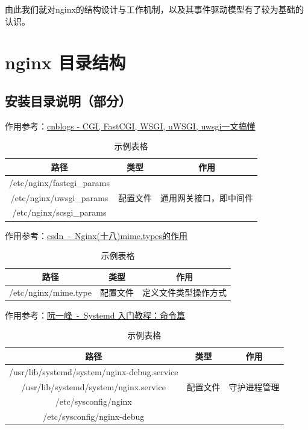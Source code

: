 \documentclass[12pt, a4paper]{article} %
\renewcommand{\tablename}{表} %
\begin{document}
\begin{CJK*}{UTF8}{gbsn}
由此我们就对nginx的结构设计与工作机制，以及其事件驱动模型有了较为基础的认识。


\clearpage
\section{nginx 目录结构}
\subsection{安装目录说明（部分）}

作用参考：\href{https://www.cnblogs.com/kai-/p/12810051.html}{cnblogs - CGI, FastCGI, WSGI, uWSGI, uwsgi一文搞懂}

\renewcommand{\tablename}{表}
\begin{table}[htbp]
    \centering
    \caption{示例表格}
    \begin{tabular}{ccc}
      \toprule
      路径 & 类型 & 作用 \\
      \midrule
      /etc/nginx/fastcgi\_params &  &  \\
      /etc/nginx/uwsgi\_params & 配置文件 & 通用网关接口，即中间件 \\
      /etc/nginx/scsgi\_params &  & \\
      \bottomrule
    \end{tabular}
  \end{table}

作用参考：\href{https://blog.csdn.net/wzj_110/article/details/112850811}{csdn~-~Nginx(十八)mime.types的作用}

\renewcommand{\tablename}{表}
\begin{table}[htbp]
    \centering
    \caption{示例表格}
    \begin{tabular}{ccc}
      \toprule
      路径 & 类型 & 作用 \\
      \midrule
      /etc/nginx/mime.type & 配置文件 & 定义文件类型操作方式 \\
      \bottomrule
    \end{tabular}
  \end{table}

作用参考：\href{http://www.ruanyifeng.com/blog/2016/03/systemd-tutorial-commands.html}{阮一峰~-~Systemd 入门教程：命令篇}

\renewcommand{\tablename}{表}
\begin{table}[htbp]
    \centering
    \caption{示例表格}
    \begin{tabular}{ccc}
      \toprule
      路径 & 类型 & 作用 \\
      \midrule
      /usr/lib/systemd/system/nginx-debug.service &  &  \\
/usr/lib/systemd/system/nginx.service & 配置文件 & 守护进程管理 \\
/etc/sysconfig/nginx &  & \\
/etc/sysconfig/nginx-debug &  & \\
      \bottomrule
    \end{tabular}
  \end{table}


\end{CJK*}
\end{document}
